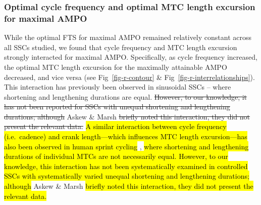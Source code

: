 \documentclass[
  10pt,
  letterpaper,
]{article}
\begin{document}
\subsubsection{Optimal cycle frequency and optimal MTC length excursion
for maximal
AMPO}\label{optimal-cycle-frequency-and-optimal-mtc-length-excursion-for-maximal-ampo}

While the optimal FTS for maximal AMPO remained relatively constant
across all SSCs studied, we found that cycle frequency and MTC length
excursion strongly interacted for maximal AMPO. Specifically, as cycle
frequency increased, the optimal MTC length excursion for the maximally
attainable AMPO decreased, and vice versa (see Fig~\ref{fig-r-contour}
\& Fig~\ref{fig-r-interrelationships}). This interaction has previously
been observed in sinusoidal SSCs \citep[e.g.][]{james_isometric_1996} --
where shortening and lengthening durations are equal. \st{However, to
our knowledge, it has not been reported for SSCs with unequal shortening
and lengthening durations; although} {Askew \& Marsh
\citep{askew_effects_1997}} \st{briefly noted this interaction, they did
not present the relevant data.} \hl{A similar interaction between cycle
frequency (i.e.~cadence) and crank length---which influences MTC length
excursion---has also been observed in human sprint cycling}
\citep[e.g.][]{martin_determinants_2001}, \hl{where shortening and
lengthening durations of individual MTCs are not necessarily equal.
However, to our knowledge, this interaction has not been systematically
examined in controlled SSCs with systematically varied unequal
shortening and lengthening durations; although} {Askew \& Marsh
\citep{askew_effects_1997}} \hl{briefly noted this interaction, they did
not present the relevant data.}
\end{document}
